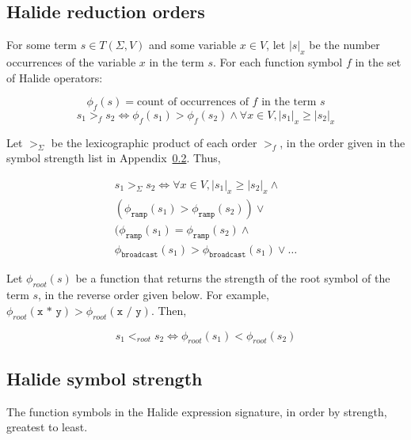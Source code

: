 \documentclass[sigplan,review,anonymous]{acmart}\settopmatter{printfolios=true,printccs=false,printacmref=false}
\begin{document}
\subsection{Halide reduction orders}

For some term $s \in T(\Sigma, V)$ and some variable $x \in V$, let $|s|_x$ be the number occurrences of the variable $x$ in the term $s$. For each function symbol $f$ in the set of Halide operators:

\[
\phi_f(s) = \textrm{count of occurrences of } f \textrm{ in the term } s
\] 
\[
s_1 >_f s_2 \iff \phi_f(s_1) > \phi_f(s_2) \wedge \forall x \in V, |s_1|_x \geq |s_2|_x
\]

Let $>_\Sigma$ be the lexicographic product of each order $>_f$, in the order given in the symbol strength list in Appendix~\ref{symbolstrength}. Thus,

\[
\begin{aligned}
s_1 >_\Sigma s_2 \iff \forall x \in V, |s_1|_x \geq |s_2|_x \wedge \\ (\phi_{\texttt{ramp}}(s_1) > \phi_{\texttt{ramp}}(s_2)) \vee \\ (\phi_{\texttt{ramp}}(s_1) = \phi_{\texttt{ramp}}(s_2) \wedge \\ \phi_{\texttt{broadcast}}(s_1) > \phi_{\texttt{broadcast}}(s_1) \vee \ldots
\end{aligned}
\]

Let $\phi_{root}(s)$ be a function that returns the strength of the root symbol of the term $s$, in the reverse order given below. For example, $\phi_{root}(\texttt{x * y}) > \phi_{root}(\texttt{x / y})$. Then,

\[
s_1 <_{root} s_2 \iff \phi_{root}(s_1) < \phi_{root}(s_2)
\]

\subsection{Halide symbol strength} \label{symbolstrength}

The function symbols in the Halide expression signature, in order by strength, greatest to least.
\end{document}
